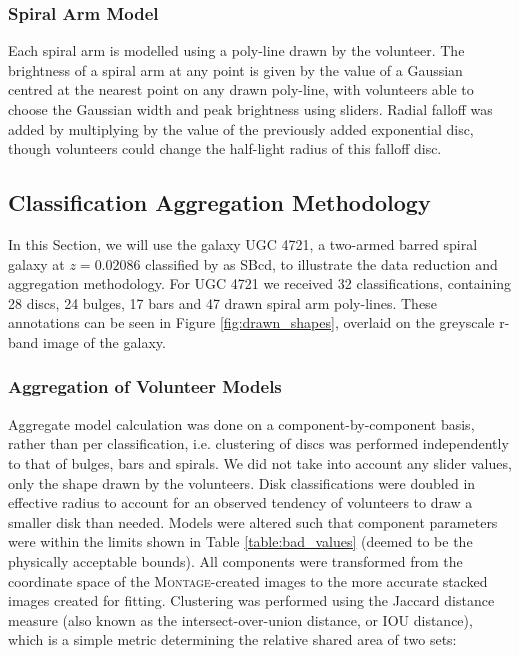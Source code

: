 \documentclass[../main.tex]{subfiles}
\begin{document}
\subsubsection{Spiral Arm Model}
Each spiral arm is modelled using a poly-line drawn by the volunteer. The brightness of a spiral arm at any point is given by the value of a Gaussian centred at the nearest point on any drawn poly-line, with volunteers able to choose the Gaussian width and peak brightness using sliders. Radial falloff was added by multiplying by the value of the previously added exponential disc, though volunteers could change the half-light radius of this falloff disc.

\subsection{Classification Aggregation Methodology}

In this Section, we will use the galaxy UGC 4721, a two-armed barred spiral galaxy at $z=0.02086$ classified by \citet{deVaucouleurs1991} as SBcd, to illustrate the data reduction and aggregation methodology. For UGC 4721 we received 32 classifications, containing 28 discs, 24 bulges, 17 bars and 47 drawn spiral arm poly-lines. These annotations can be seen in Figure \ref{fig:drawn_shapes}, overlaid on the greyscale r-band image of the galaxy.

\begin{figure*}
  \caption{Components drawn by volunteers for UGC 4721. The top left panel shows drawn discs, top right shows drawn bulges, bottom left shows drawn bars and bottom right shows drawn spiral arms. Discs, bulges and bars are displayed at twice their effective radii.}
  \label{fig:drawn_shapes}
\end{figure*}

\subsubsection{Aggregation of Volunteer Models}
\label{sec:aggregation_of_volunteer_models}

Aggregate model calculation was done on a component-by-component basis, rather than per classification, i.e. clustering of discs was performed independently to that of bulges, bars and spirals. We did not take into account any slider values, only the shape drawn by the volunteers. Disk classifications were doubled in effective radius to account for an observed tendency of volunteers to draw a smaller disk than needed. Models were altered such that component parameters were within the limits shown in Table \ref{table:bad_values} (deemed to be the physically acceptable bounds). All components were transformed from the coordinate space of the \textsc{Montage}-created images to the more accurate stacked images created for fitting. Clustering was performed using the Jaccard distance measure (also known as the intersect-over-union distance, or IOU distance), which is a simple metric determining the relative shared area of two sets:
\end{document}
